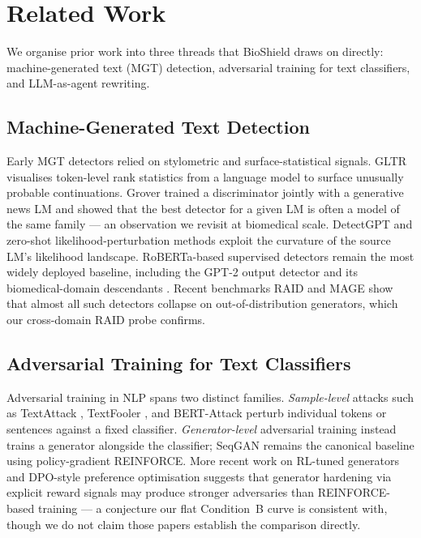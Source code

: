 \section{Related Work}
\label{sec:related}

We organise prior work into three threads that BioShield draws on directly:
machine-generated text (MGT) detection, adversarial training for text
classifiers, and LLM-as-agent rewriting.

\subsection{Machine-Generated Text Detection}
Early MGT detectors relied on stylometric and surface-statistical signals.
GLTR \cite{gehrmann2019gltr} visualises token-level rank statistics from a
language model to surface unusually probable continuations. Grover
\cite{zellers2019defending} trained a discriminator jointly with a generative
news LM and showed that the best detector for a given LM is often a model
of the same family — an observation we revisit at biomedical scale.
DetectGPT \cite{mitchell2023detectgpt} and zero-shot likelihood-perturbation
methods exploit the curvature of the source LM's likelihood landscape.
RoBERTa-based supervised detectors \cite{solaiman2019releasestrategies} remain
the most widely deployed baseline, including the GPT-2 output detector and
its biomedical-domain descendants \cite{liang2023gptdetect}. Recent
benchmarks RAID \cite{dugan2024raid} and MAGE \cite{li2024mage} show
that almost all such detectors collapse on out-of-distribution generators,
which our cross-domain RAID probe confirms.

\subsection{Adversarial Training for Text Classifiers}
Adversarial training in NLP spans two distinct families. \emph{Sample-level}
attacks such as TextAttack \cite{morris2020textattack},
TextFooler \cite{jin2020textfooler}, and BERT-Attack
\cite{li2020bertattack} perturb individual tokens or sentences against a
fixed classifier. \emph{Generator-level} adversarial training instead
trains a generator alongside the classifier; SeqGAN \cite{yu2017seqgan}
remains the canonical baseline using policy-gradient REINFORCE. More recent
work on RL-tuned generators \cite{ouyang2022rlhf} and DPO-style preference
optimisation \cite{rafailov2023dpo} suggests that generator hardening via
explicit reward signals may produce stronger adversaries than REINFORCE-based
training — a conjecture our flat Condition~B curve is consistent with,
though we do not claim those papers establish the comparison directly.

